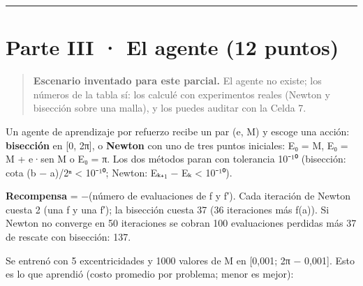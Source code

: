 \begin{center}\rule{0.5\linewidth}{0.5pt}\end{center}

\section{Parte III · El agente (12 puntos)}

\begin{quote}
\textbf{Escenario inventado para este parcial.} El agente no existe; los números de la tabla sí: los calculé con experimentos reales (Newton y bisección sobre una malla), y los puedes auditar con la Celda 7.
\end{quote}

Un agente de aprendizaje por refuerzo recibe un par (e, M) y escoge una acción: \textbf{bisección} en {[}0, 2π{]}, o \textbf{Newton} con uno de tres puntos iniciales: E₀ = M, E₀ = M + e·sen M o E₀ = π. Los dos métodos paran con tolerancia 10⁻¹⁰ (bisección: cota (b − a)/2ⁿ \textless{} 10⁻¹⁰; Newton: \textbar Eₖ₊₁ − Eₖ\textbar{} \textless{} 10⁻¹⁰).

\textbf{Recompensa} = −(número de evaluaciones de f y f′). Cada iteración de Newton cuesta 2 (una f y una f′); la bisección cuesta 37 (36 iteraciones más f(a)). Si Newton no converge en 50 iteraciones se cobran 100 evaluaciones perdidas más 37 de rescate con bisección: 137.

Se entrenó con 5 excentricidades y 1000 valores de M en {[}0,001; 2π − 0,001{]}. Esto es lo que aprendió (costo promedio por problema; menor es mejor):


